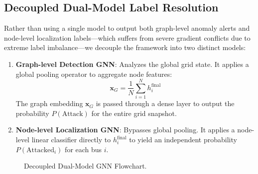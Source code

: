\documentclass[conference]{IEEEtran}
\begin{document}
\subsection{Decoupled Dual-Model Label Resolution}
Rather than using a single model to output both graph-level anomaly alerts and node-level localization labels—which suffers from severe gradient conflicts due to extreme label imbalance—we decouple the framework into two distinct models:
\begin{enumerate}
    \item \textbf{Graph-level Detection GNN}: Analyzes the global grid state. It applies a global pooling operator to aggregate node features:
    \begin{equation}
    \mathbf{x}_G = \frac{1}{N} \sum_{i=1}^N h^{\text{final}}_i
    \end{equation}
    The graph embedding $\mathbf{x}_G$ is passed through a dense layer to output the probability $P(\text{Attack})$ for the entire grid snapshot.
    \item \textbf{Node-level Localization GNN}: Bypasses global pooling. It applies a node-level linear classifier directly to $h^{\text{final}}_i$ to yield an independent probability $P(\text{Attacked}_i)$ for each bus $i$.
\end{enumerate}

\begin{figure}[!t]
    \centering
    \caption{Decoupled Dual-Model GNN Flowchart.}
\end{figure}
\end{document}
